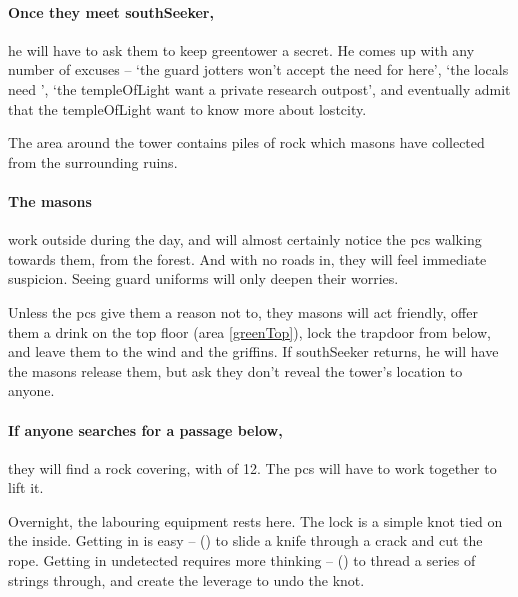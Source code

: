 \begin{multicols}{2}
\paragraph{Once they meet \gls{southSeeker},}
he will have to ask them to keep \gls{greentower} a secret.
He comes up with any number of excuses -- `the \gls{guard} \glspl{jotter} won't accept the need for  here', `the locals need ', `the \gls{templeOfLight} want a private research outpost', and eventually admit that the \gls{templeOfLight} want to know more about \gls{lostcity}.


The area around the tower contains piles of rock which masons have collected from the surrounding ruins.

\paragraph{The masons}
work outside during the day, and will almost certainly notice the \glspl{pc} walking towards them, from the forest.
And with no roads in, they will feel immediate suspicion.
Seeing \gls{guard} uniforms will only deepen their worries.

Unless the \glspl{pc} give them a reason not to, they masons will act friendly, offer them a drink on the top floor (area \ref{greenTop}), lock the trapdoor from below, and leave them to the wind and the griffins.
If \gls{southSeeker} returns, he will have the masons release them, but ask they don't reveal the tower's location to anyone.


\paragraph{If anyone searches for a passage below,}
they will find a rock covering, with  of 12.
The \glspl{pc} will have to work together to lift it.%


Overnight, the labouring equipment rests here.
The lock is a simple knot tied on the inside.
Getting in is easy --  (\tn[6]) to slide a knife through a crack and cut the rope.
Getting in undetected requires more thinking --  (\tn[14]) to thread a series of strings through, and create the leverage to undo the knot.


\end{multicols}
